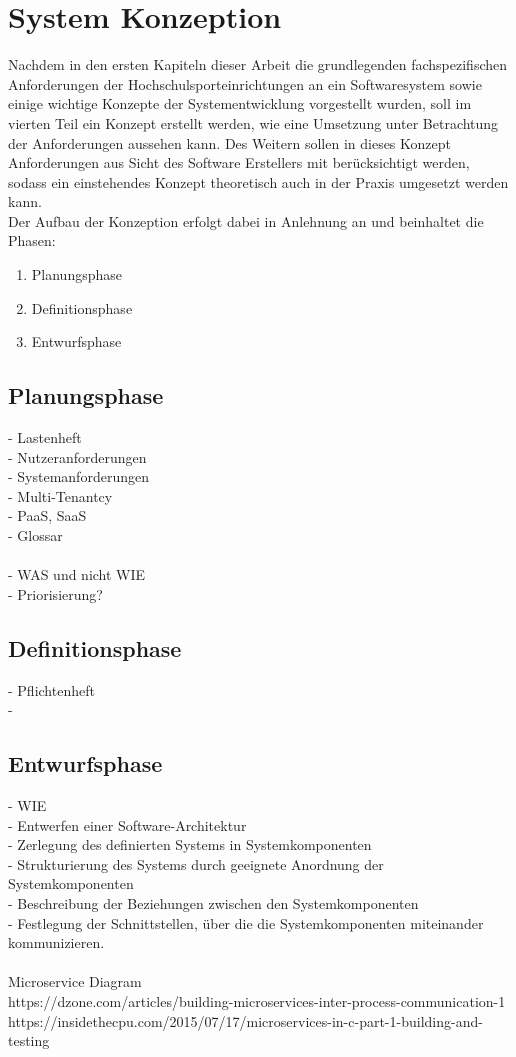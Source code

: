 \chapter{System Konzeption} 
\label{ch:konzeption} 
Nachdem in den ersten Kapiteln dieser Arbeit die grundlegenden fachspezifischen Anforderungen der Hochschulsporteinrichtungen an ein Softwaresystem sowie einige wichtige Konzepte der Systementwicklung vorgestellt wurden, soll im vierten Teil ein Konzept erstellt werden, wie eine Umsetzung unter Betrachtung der Anforderungen aussehen kann. Des Weitern sollen in dieses Konzept Anforderungen aus Sicht  des Software Erstellers mit berücksichtigt werden, sodass ein einstehendes Konzept theoretisch auch in der Praxis umgesetzt werden kann. \\
Der Aufbau der Konzeption erfolgt dabei in Anlehnung an \citet*[]{Balzert.1996} und beinhaltet die Phasen:
\begin{enumerate}
\item Planungsphase
\item Definitionsphase
\item Entwurfsphase
\end{enumerate}

\section{Planungsphase}
- Lastenheft \\
  - Nutzeranforderungen\\
  - Systemanforderungen\\
	  - Multi-Tenantcy\\
	  - PaaS, SaaS\\
 - Glossar\\
\\
- WAS und nicht WIE\\
- Priorisierung?\\
\section{Definitionsphase}
- Pflichtenheft\\
- \\
\section{Entwurfsphase}
- WIE\\
- Entwerfen einer Software-Architektur\\
	- Zerlegung des definierten Systems in Systemkomponenten\\
	- Strukturierung des Systems durch geeignete Anordnung der Systemkomponenten\\
	- Beschreibung der Beziehungen zwischen den Systemkomponenten\\
- Festlegung der Schnittstellen, über die die Systemkomponenten miteinander kommunizieren.\\
\\
Microservice Diagram\\
https://dzone.com/articles/building-microservices-inter-process-communication-1\\
https://insidethecpu.com/2015/07/17/microservices-in-c-part-1-building-and-testing\\